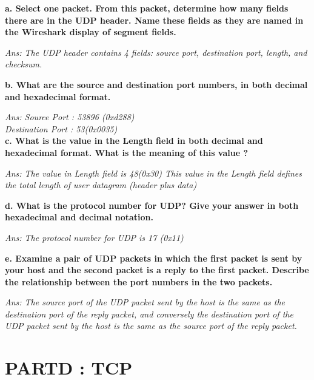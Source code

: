 \documentclass[11pt]{article}
\numberwithin{equation}{section}
\begin{document}


\textbf{a. Select one packet. From this packet, determine how many fields there are in the UDP header. Name these fields as they are named in the Wireshark display of segment fields.} 

\textsl{Ans: The UDP header contains 4 fields: source port, destination port, length, and checksum.} \newline

\textbf{b. What are the source and destination port numbers, in both decimal and hexadecimal format.} 

\textsl{Ans: Source Port : 53896 (0xd288)}  \\
             \hspace{5 cm} \textsl{Destination Port : 53(0x0035)} \\

\textbf{c. What is the value in the Length field in both decimal and hexadecimal format. What is the meaning of this value ?}

\textsl{Ans: The value in Length field is 48(0x30) \newline
              This value in the Length field defines the total length of user datagram (header plus data)} \newline

\textbf{d. What is the protocol number for UDP? Give your answer in both hexadecimal and decimal notation.} 

\textsl{Ans: The protocol number for UDP is 17 (0x11)} \newline

\textbf{e. Examine a pair of UDP packets in which the first packet is sent by your host and the second packet is a reply to the first packet. Describe the relationship between the port numbers in the two packets.}

\textsl{Ans: The source port of the UDP packet sent by the host is the same as the destination port of the reply packet, and conversely the destination port of the UDP packet sent by the host is the same as the source port of the reply packet.}

\section*{PARTD : TCP}
\end{document}
